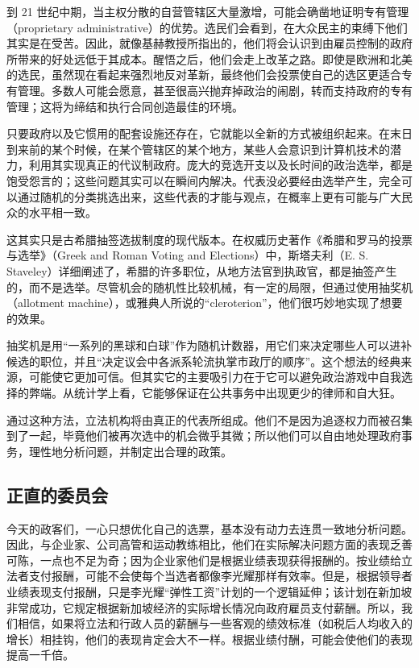 到 21 世纪中期，当主权分散的自营管辖区大量激增，可能会确凿地证明专有管理（proprietary administrative）的优势。选民们会看到，在大众民主的束缚下他们其实是在受苦。因此，就像基赫教授所指出的，他们将会认识到由雇员控制的政府所带来的好处远低于其成本。醒悟之后，他们会走上改革之路。即使是欧洲和北美的选民，虽然现在看起来强烈地反对革新，最终他们会投票使自己的选区更适合专有管理。多数人可能会愿意，甚至很高兴抛弃掉政治的闹剧，转而支持政府的专有管理；这将为缔结和执行合同创造最佳的环境。

只要政府以及它惯用的配套设施还存在，它就能以全新的方式被组织起来。在末日到来前的某个时候，在某个管辖区的某个地方，某些人会意识到计算机技术的潜力，利用其实现真正的代议制政府。庞大的竞选开支以及长时间的政治选举，都是饱受怨言的；这些问题其实可以在瞬间内解决。代表没必要经由选举产生，完全可以通过随机的分类挑选出来，这些代表的才能与观点，在概率上更有可能与广大民众的水平相一致。

这其实只是古希腊抽签选拔制度的现代版本。在权威历史著作《希腊和罗马的投票与选举》（Greek and Roman Voting and Elections）中，斯塔夫利（E. S. Staveley）详细阐述了，希腊的许多职位，从地方法官到执政官，都是抽签产生的，而不是选举。尽管机会的随机性比较机械，有一定的局限，但通过使用抽奖机（allotment machine），或雅典人所说的“cleroterion”，他们很巧妙地实现了想要的效果。

抽奖机是用“一系列的黑球和白球”作为随机计数器，用它们来决定哪些人可以进补候选的职位，并且“决定议会中各派系轮流执掌市政厅的顺序”。这个想法的经典来源，可能使它更加可信。但其实它的主要吸引力在于它可以避免政治游戏中自我选择的弊端。从统计学上看，它能够保证在公共事务中出现更少的律师和自大狂。

通过这种方法，立法机构将由真正的代表所组成。他们不是因为追逐权力而被召集到了一起，毕竟他们被再次选中的机会微乎其微；所以他们可以自由地处理政府事务，理性地分析问题，并制定出合理的政策。

\subsection{正直的委员会}
今天的政客们，一心只想优化自己的选票，基本没有动力去连贯一致地分析问题。因此，与企业家、公司高管和运动教练相比，他们在实际解决问题方面的表现乏善可陈，一点也不足为奇；因为企业家他们是根据业绩表现获得报酬的。按业绩给立法者支付报酬，可能不会使每个当选者都像李光耀那样有效率。但是，根据领导者业绩表现支付报酬，只是李光耀“弹性工资”计划的一个逻辑延伸；该计划在新加坡非常成功，它规定根据新加坡经济的实际增长情况向政府雇员支付薪酬。所以，我们相信，如果将立法和行政人员的薪酬与一些客观的绩效标准（如税后人均收入的增长）相挂钩，他们的表现肯定会大不一样。根据业绩付酬，可能会使他们的表现提高一千倍。

